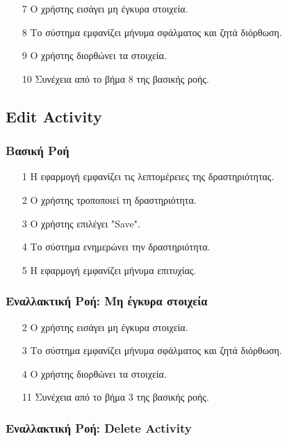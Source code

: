 \begin{enumerate}
    \item[7] Ο χρήστης εισάγει μη έγκυρα στοιχεία.
    \item[8] Το σύστημα εμφανίζει μήνυμα σφάλματος και ζητά διόρθωση.
    \item[9] Ο χρήστης διορθώνει τα στοιχεία.
    \item[10] Συνέχεια από το βήμα 8 της βασικής ροής.
\end{enumerate}

\subsection{Edit Activity}

\subsubsection{Βασική Ροή}

\begin{enumerate}
    \item[1] Η εφαρμογή εμφανίζει τις λεπτομέρειες της δραστηριότητας.
    \item[2] Ο χρήστης τροποποιεί τη δραστηριότητα.
    \item[3] O χρήστης επιλέγει "Save".
    \item[4] Το σύστημα ενημερώνει την δραστηριότητα.
    \item[5] Η εφαρμογή εμφανίζει μήνυμα επιτυχίας.
\end{enumerate}

\subsubsection{Εναλλακτική Ροή: Μη έγκυρα στοιχεία}

\begin{enumerate}
    \item[2] Ο χρήστης εισάγει μη έγκυρα στοιχεία.
    \item[3] Το σύστημα εμφανίζει μήνυμα σφάλματος και ζητά διόρθωση.
    \item[4] Ο χρήστης διορθώνει τα στοιχεία.
    \item[11] Συνέχεια από το βήμα 3 της βασικής ροής.
\end{enumerate}

\subsubsection{Εναλλακτική Ροή: Delete Activity}

